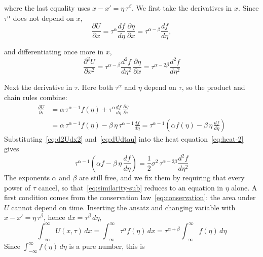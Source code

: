 \documentclass[a4paper,12pt]{article}
\numberwithin{equation}{section}
\begin{document}
where the last equality uses $x - x' = \eta\,\tau^{\beta}$. We first take the derivatives in $x$. Since $\tau^{\alpha}$ does not depend on
$x$,
\[
  \frac{\partial U}{\partial x}
    = \tau^{\alpha}\frac{df}{d\eta}\,\frac{\partial \eta}{\partial x}
    = \tau^{\alpha-\beta}\frac{df}{d\eta},
\]

and differentiating once more in $x$,
\begin{equation}\label{eq:d2Udx2}
  \frac{\partial^2 U}{\partial x^2}
    = \tau^{\alpha-\beta}\frac{d^2 f}{d\eta^2}\,\frac{\partial \eta}{\partial x}
    = \tau^{\alpha-2\beta}\frac{d^2 f}{d\eta^2}
\end{equation}

Next the derivative in $\tau$. Here both $\tau^{\alpha}$ and $\eta$ depend on
$\tau$, so the product and chain rules combine:
\begin{equation}\label{eq:dUdtau}
\begin{aligned}
  \frac{\partial U}{\partial \tau}
    &= \alpha\,\tau^{\alpha-1}f(\eta)
       + \tau^{\alpha}\frac{df}{d\eta}\,\frac{\partial \eta}{\partial \tau} \\
    &= \alpha\,\tau^{\alpha-1}f(\eta)
       - \beta\,\eta\,\tau^{\alpha-1}\frac{df}{d\eta}
     = \tau^{\alpha-1}\left(\alpha f(\eta)
       - \beta\,\eta\,\frac{df}{d\eta}\right)
\end{aligned}
\end{equation}
Substituting~\eqref{eq:d2Udx2} and~\eqref{eq:dUdtau} into the heat
equation~\eqref{eq:heat-2} gives
\begin{equation}\label{eq:similarity-sub}
  \tau^{\alpha-1}\left(\alpha f - \beta\,\eta\,\frac{df}{d\eta}\right)
    = \frac{1}{2}\sigma^{2}\,\tau^{\alpha-2\beta}\frac{d^2 f}{d\eta^2}
\end{equation}
The exponents $\alpha$ and $\beta$ are still free, and we fix them by requiring
that every power of $\tau$ cancel, so that~\eqref{eq:similarity-sub} reduces to an
equation in $\eta$ alone. A first condition comes from the conservation
law~\eqref{eq:conservation}: the area under $U$ cannot depend on time. Inserting
the ansatz and changing variable with $x - x' = \eta\,\tau^{\beta}$, hence
$dx = \tau^{\beta}\,d\eta$,
\begin{equation}\label{eq:cons-scaling}
  \int_{-\infty}^{\infty} U(x,\tau)\,dx
    = \int_{-\infty}^{\infty} \tau^{\alpha} f(\eta)\,dx
    = \tau^{\alpha+\beta}\int_{-\infty}^{\infty} f(\eta)\,d\eta 
\end{equation}
Since $\int_{-\infty}^{\infty} f(\eta)\,d\eta$ is a pure number, this is
\end{document}
